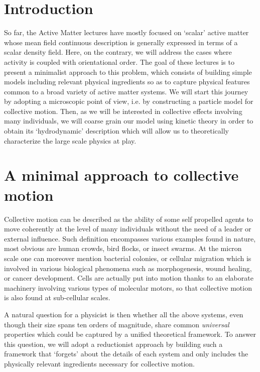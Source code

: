 
\section{Introduction}

So far, the Active Matter lectures have mostly focused on `scalar' active matter whose mean field continuous description
is generally expressed in terms of a scalar density field.
Here, on the contrary, we will address the cases where activity is coupled with orientational order.
The goal of these lectures is to present a minimalist approach to this problem, which consists of building simple models 
including relevant physical ingredients so as to capture physical features common to a broad variety of active matter systems.
We will start this journey by adopting a microscopic point of view, i.e. by constructing a particle model for collective motion.
Then, as we will be interested in collective effects involving many individuals, 
we will coarse grain our model using kinetic theory in order to obtain its `hydrodynamic' description
which will allow us to theoretically characterize the large scale physics at play.

\section{A minimal approach to collective motion} 

Collective motion can be described as the ability of some self propelled agents to move coherently at the level of many individuals without the need of a leader or external influence.
Such definition encompasses various examples found in nature, 
most obvious are human crowds, bird flocks, or insect swarms.
At the micron scale one can moreover mention bacterial colonies, or cellular migration which is involved in various biological phenomena such as morphogenesis, wound healing, or cancer development.
Cells are actually put into motion thanks to an elaborate machinery involving various types of molecular motors, so that collective motion is also found at sub-cellular scales.

A natural question for a physicist is then whether all the above systems, even though their size spans ten orders of magnitude, share common {\it universal} properties which could be captured by a unified theoretical framework.
To answer this question, we will adopt a reductionist approach by building such a framework that `forgets' about the details of each system and only includes the physically relevant ingredients necessary for collective motion.

